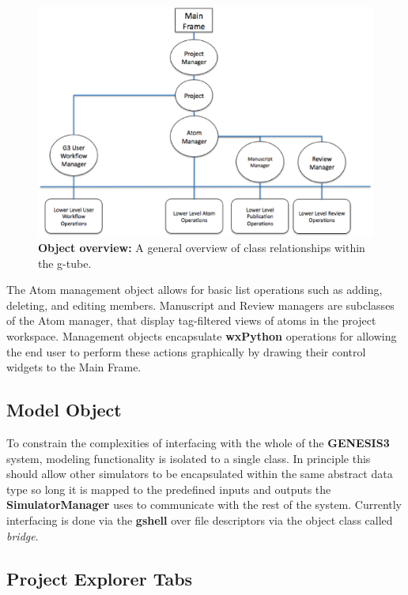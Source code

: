 \documentclass[12pt]{article}
\begin{document}
\begin{figure}[ht]
   \centering
   \includegraphics[scale=0.50]{figures/Overview.eps}
   \caption{{\bf Object overview:} A general overview of class relationships within the g-tube.}
   \label{figure: 1}
\end{figure}

The Atom management object allows for basic list operations such as adding, deleting, and editing members. Manuscript and Review managers are subclasses of the Atom manager, that display tag-filtered views of atoms in the project workspace. Management objects encapsulate {\bf wxPython} operations for allowing the end user to perform these actions graphically by drawing their control widgets to the Main Frame. 

\subsection*{Model Object}

	To constrain the complexities of interfacing with the whole of the {\bf GENESIS3} system, modeling functionality is isolated to a single class. In principle this should allow other simulators to be encapsulated within the same abstract data type so long it is mapped to the predefined inputs and outputs the {\bf SimulatorManager} uses to communicate with the rest of the system.
	Currently interfacing is done via the {\bf gshell} over file descriptors via the object class called {\it bridge}. 
	
\subsection*{Project Explorer Tabs}
\end{document}
